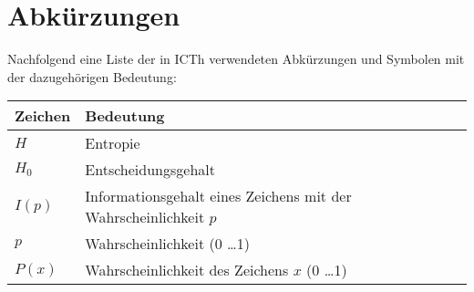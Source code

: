 \section{Abkürzungen}

Nachfolgend eine Liste der in ICTh verwendeten Abkürzungen und Symbolen mit der
dazugehörigen Bedeutung:

\begin{tabular}[H]{|l|l|}
	\hline
	\textbf{Zeichen} & \textbf{Bedeutung} \\
	\hline
	$H$ & Entropie \\
	$H_0$ & Entscheidungsgehalt \\
	$I(p)$ & Informationsgehalt eines Zeichens mit der Wahrscheinlichkeit $p$ \\
	$p$ & Wahrscheinlichkeit (0 \ldots 1) \\
	$P(x)$ & Wahrscheinlichkeit des Zeichens $x$ (0 \ldots 1) \\
	\hline
\end{tabular}
